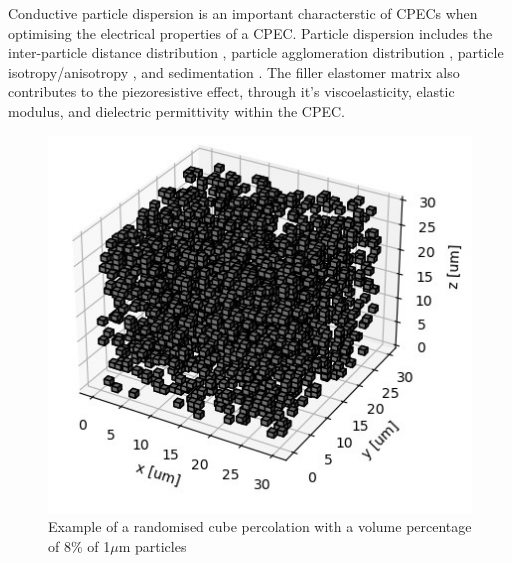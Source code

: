 Conductive particle dispersion is an important characterstic of CPECs when optimising the electrical properties of a CPEC. Particle dispersion includes the inter-particle distance distribution \cite{Kim2012}, particle agglomeration distribution \cite{Pegel2008}, particle isotropy/anisotropy \cite{Song2022}, and sedimentation \cite{Eklund2019}. The filler elastomer matrix also contributes to the piezoresistive effect, through it's viscoelasticity, elastic modulus, and dielectric permittivity within the CPEC.

\begin{figure}[H]
    \centering
    \includegraphics[width=0.6\linewidth]{Figures/simple_random_percolation.jpg}
    \caption{Example of a randomised cube percolation with a volume percentage of 8\% of 1$\mu$m particles}
    \label{fig:simp_rand_perc}
\end{figure}

